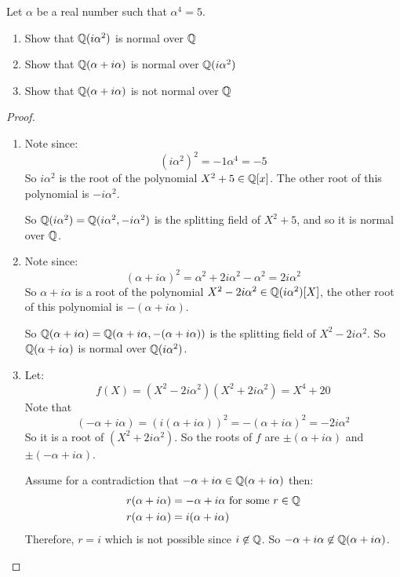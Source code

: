 \begin{exercise}
Let $\alpha$ be a real number such that $\alpha^4 = 5$.\begin{enumerate}[label = (\alph*)]
    \item Show that $\mathbb{Q}(i\alpha^2)$ is normal over $\mathbb{Q}$
    \item Show that $\mathbb{Q}(\alpha+i\alpha)$ is normal over $\mathbb{Q}(i\alpha^2)$
    \item Show that $\mathbb{Q}(\alpha+i\alpha)$ is not normal over $\mathbb{Q}$
\end{enumerate}
\begin{proof}
    \begin{enumerate}[label = (\alph*)]
    \item Note since:\begin{equation}
        {(i\alpha^2)}^2 = -1\alpha^4 = -5
    \end{equation}
    So $i\alpha^2$ is the root of the polynomial $X^2+5\in\mathbb{Q}[x]$. The other root of this polynomial is $-i\alpha^2$.
    
    So $\mathbb{Q}(i\alpha^2) = \mathbb{Q}(i\alpha^2,-i\alpha^2)$ is the splitting field of $X^2+5$, and so it is normal over $\mathbb{Q}$.
    
    \item Note since:\begin{equation}
        {(\alpha+i\alpha)}^2 = \alpha^2 + 2i\alpha^2 - \alpha^2 = 2i\alpha^2
    \end{equation}
    So $\alpha+i\alpha$ is a root of the polynomial $X^2-2i\alpha^2\in \mathbb{Q}(i\alpha^2)[X]$, the other root of this polynomial is $-(\alpha+i\alpha)$. 
    
    So $\mathbb{Q}(\alpha+i\alpha) = \mathbb{Q}(\alpha+i\alpha, -(\alpha+i\alpha))$ is the splitting field of 
    $X^2-2i\alpha^2$. So $\mathbb{Q}(\alpha+i\alpha)$ is normal over $\mathbb{Q}(i\alpha^2)$.
    
    \item Let:\begin{equation}
          f(X) = (X^2-2i\alpha^2)(X^2+2i\alpha^2) = X^4+20
    \end{equation}
    Note that\begin{equation}
        {(-\alpha+i\alpha)=(i(\alpha+i\alpha))}^2= {-(\alpha+i\alpha)}^2=-2i\alpha^2
    \end{equation}
    So it is a root of $(X^2+2i\alpha^2)$. So the roots of $f$ are $\pm (\alpha+i\alpha)$ and $\pm (-\alpha+i\alpha)$.
    
    Assume for a contradiction that $-\alpha+i\alpha\in \mathbb{Q}(\alpha+i\alpha)$ then:\begin{align*}
        r(\alpha+i\alpha) &= -\alpha+i\alpha \text{ for some }r\in \mathbb{Q}\\
        r(\alpha+i\alpha) &= i(\alpha+i\alpha)\\
    \end{align*}
    Therefore, $r = i$ which is not possible since $i\not\in \mathbb{Q}$. So $-\alpha+i\alpha\not\in \mathbb{Q}(\alpha+i\alpha)$.
    

\end{enumerate}
\end{proof}
\end{exercise}

